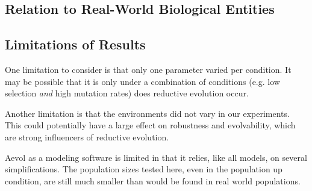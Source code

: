 \subsection{Relation to Real-World Biological Entities}
\subsection{Limitations of Results}\label{limitations}
One limitation to consider is that only one parameter varied per condition. It may be possible that it is only under a combination of conditions (e.g. low selection \textit{and} high mutation rates) does reductive evolution occur. 

Another limitation is that the environments did not vary in our experiments. This could potentially have a large effect on robustness and evolvability, which are strong influencers of reductive evolution. 

Aevol as a modeling software is limited in that it relies, like all models, on several simplifications. The population sizes tested here, even in the population up condition, are still much smaller than would be found in real world populations. 